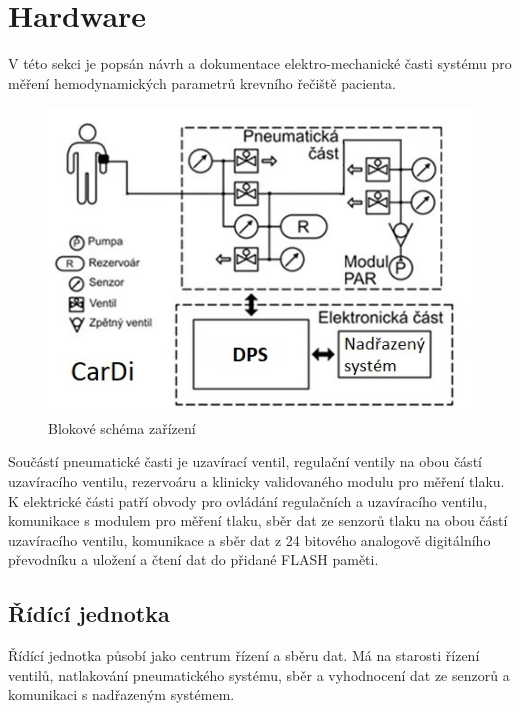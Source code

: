 \chapter{Hardware}
V této sekci je popsán návrh a dokumentace elektro-mechanické časti systému pro měření hemodynamických parametrů krevního řečiště pacienta.

\begin{figure}[H]
    \label{fig:block_cardi}
    \includegraphics[width=1\textwidth]{pictures/blokove_schema_cele_zarizeni.jpg}
    \caption{Blokové schéma zařízení}
\end{figure}
Součástí pneumatické časti je uzavírací ventil, regulační ventily na obou částí uzavíracího ventilu, rezervoáru a klinicky validovaného modulu pro měření tlaku.
K elektrické části patří obvody pro ovládání regulačních a uzavíracího ventilu, komunikace s modulem pro měření tlaku, sběr dat ze senzorů tlaku na obou částí uzavíracího ventilu, komunikace a sběr dat z 24 bitového analogově digitálního převodníku a
uložení a čtení dat do přidané FLASH paměti.
\section{Řídící jednotka}

Řídící jednotka působí jako centrum řízení a sběru dat. Má na starosti řízení ventilů, natlakování pneumatického systému, sběr a vyhodnocení
dat ze senzorů a komunikaci s nadřazeným systémem. \par

